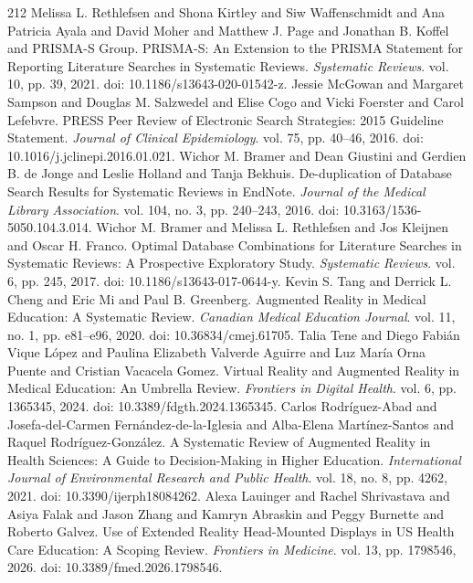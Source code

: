 \begin{thebibliography}{212}
 Melissa L. Rethlefsen and Shona Kirtley and Siw Waffenschmidt and Ana Patricia Ayala and David Moher and Matthew J. Page and Jonathan B. Koffel and {PRISMA-S Group}. {PRISMA-S}: An Extension to the {PRISMA} Statement for Reporting Literature Searches in Systematic Reviews. \emph{Systematic Reviews}. vol. 10, pp. 39, 2021. doi: 10.1186/s13643-020-01542-z.
 Jessie McGowan and Margaret Sampson and Douglas M. Salzwedel and Elise Cogo and Vicki Foerster and Carol Lefebvre. {PRESS} Peer Review of Electronic Search Strategies: 2015 Guideline Statement. \emph{Journal of Clinical Epidemiology}. vol. 75, pp. 40--46, 2016. doi: 10.1016/j.jclinepi.2016.01.021.
 Wichor M. Bramer and Dean Giustini and Gerdien B. de Jonge and Leslie Holland and Tanja Bekhuis. De-duplication of Database Search Results for Systematic Reviews in {EndNote}. \emph{Journal of the Medical Library Association}. vol. 104, no. 3, pp. 240--243, 2016. doi: 10.3163/1536-5050.104.3.014.
 Wichor M. Bramer and Melissa L. Rethlefsen and Jos Kleijnen and Oscar H. Franco. Optimal Database Combinations for Literature Searches in Systematic Reviews: A Prospective Exploratory Study. \emph{Systematic Reviews}. vol. 6, pp. 245, 2017. doi: 10.1186/s13643-017-0644-y.
 Kevin S. Tang and Derrick L. Cheng and Eric Mi and Paul B. Greenberg. Augmented Reality in Medical Education: A Systematic Review. \emph{Canadian Medical Education Journal}. vol. 11, no. 1, pp. e81--e96, 2020. doi: 10.36834/cmej.61705.
 Talia Tene and Diego Fabi{\'a}n Vique L{\'o}pez and Paulina Elizabeth Valverde Aguirre and Luz Mar{\'i}a Orna Puente and Cristian Vacacela Gomez. Virtual Reality and Augmented Reality in Medical Education: An Umbrella Review. \emph{Frontiers in Digital Health}. vol. 6, pp. 1365345, 2024. doi: 10.3389/fdgth.2024.1365345.
 Carlos Rodr{\'i}guez-Abad and Josefa-del-Carmen Fern{\'a}ndez-de-la-Iglesia and Alba-Elena Mart{\'i}nez-Santos and Raquel Rodr{\'i}guez-Gonz{\'a}lez. A Systematic Review of Augmented Reality in Health Sciences: A Guide to Decision-Making in Higher Education. \emph{International Journal of Environmental Research and Public Health}. vol. 18, no. 8, pp. 4262, 2021. doi: 10.3390/ijerph18084262.
 Alexa Lauinger and Rachel Shrivastava and Asiya Falak and Jason Zhang and Kamryn Abraskin and Peggy Burnette and Roberto Galvez. Use of Extended Reality Head-Mounted Displays in {US} Health Care Education: A Scoping Review. \emph{Frontiers in Medicine}. vol. 13, pp. 1798546, 2026. doi: 10.3389/fmed.2026.1798546.

\end{thebibliography}
